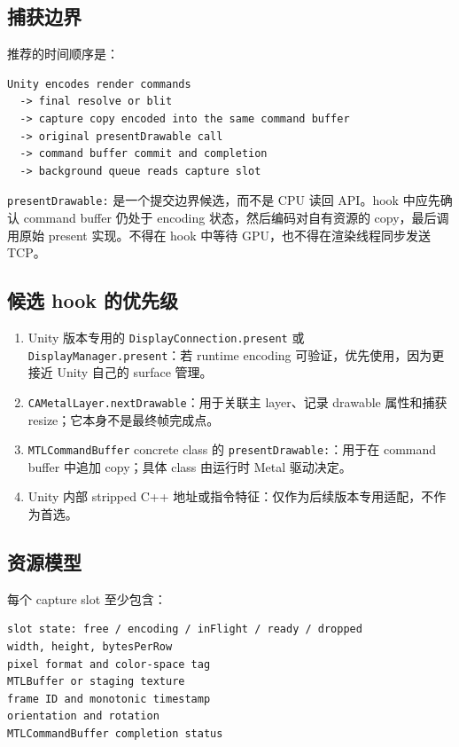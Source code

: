 \documentclass[UTF8,a4paper,11pt]{ctexart}
\begin{document}
\subsection{捕获边界}

推荐的时间顺序是：

\begin{lstlisting}
Unity encodes render commands
  -> final resolve or blit
  -> capture copy encoded into the same command buffer
  -> original presentDrawable call
  -> command buffer commit and completion
  -> background queue reads capture slot
\end{lstlisting}

\texttt{presentDrawable:} 是一个提交边界候选，而不是 CPU 读回 API。hook 中应先确认 command buffer 仍处于 encoding 状态，然后编码对自有资源的 copy，最后调用原始 present 实现。不得在 hook 中等待 GPU，也不得在渲染线程同步发送 TCP。

\subsection{候选 hook 的优先级}

\begin{enumerate}
  \item Unity 版本专用的 \texttt{DisplayConnection.present} 或 \texttt{DisplayManager.present}：若 runtime encoding 可验证，优先使用，因为更接近 Unity 自己的 surface 管理。
  \item \texttt{CAMetalLayer.nextDrawable}：用于关联主 layer、记录 drawable 属性和捕获 resize；它本身不是最终帧完成点。
  \item \texttt{MTLCommandBuffer} concrete class 的 \texttt{presentDrawable:}：用于在 command buffer 中追加 copy；具体 class 由运行时 Metal 驱动决定。
  \item Unity 内部 stripped C++ 地址或指令特征：仅作为后续版本专用适配，不作为首选。
\end{enumerate}

\subsection{资源模型}

每个 capture slot 至少包含：

\begin{lstlisting}
slot state: free / encoding / inFlight / ready / dropped
width, height, bytesPerRow
pixel format and color-space tag
MTLBuffer or staging texture
frame ID and monotonic timestamp
orientation and rotation
MTLCommandBuffer completion status
\end{lstlisting}
\end{document}
